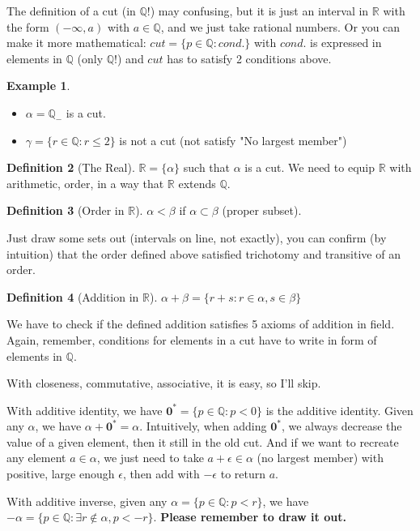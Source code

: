 \documentclass[12pt]{article}
\newcommand{\RR}{\mathbb{R}}   %
\newcommand{\QQ}{\mathbb{Q}}   %
\theoremstyle{definition}
\newtheorem{definition}{Definition}[section]
\newtheorem{example}[definition]{Example}
\theoremstyle{plain}
\begin{document}
\begin{note}
The definition of a cut (in $\QQ$!) may confusing, but it is just an interval in $\RR$ with the form $(-\infty, a)$ with $a \in \QQ$, and we just take rational numbers. Or you can make it more mathematical: $cut = \{p\in\QQ: cond.\}$ with $cond.$ is expressed in elements in $\QQ$ (only $\QQ$!) and $cut$ has to satisfy 2 conditions above.
\end{note}

\begin{example}

\begin{itemize}
    \item $\alpha = \QQ_-$ is a cut.
    \item $\gamma = \{r \in \QQ: r \le 2\}$ is not a cut (not satisfy "No largest member")
\end{itemize}

\end{example}

\begin{definition}[The Real]
$\RR = \{\alpha\}$ such that $\alpha$ is a cut. We need to equip $\RR$ with arithmetic, order, in a way that $\RR$ extends $\QQ$.
\end{definition}

\begin{definition}[Order in $\RR$]
$\alpha < \beta$ if $\alpha \subset \beta$ (proper subset).
\end{definition}

\begin{note}
Just draw some sets out (intervals on line, not exactly), you can confirm (by intuition) that the order defined above satisfied trichotomy and transitive of an order.     
\end{note}

\begin{definition}[Addition in $\RR$]
$\alpha + \beta = \{r+s: r\in\alpha, s\in\beta\}$
\end{definition}


\begin{note}
We have to check if the defined addition satisfies 5 axioms of addition in field. Again, remember, conditions for elements in a cut have to write in form of elements in $\QQ$.

With closeness, commutative, associative, it is easy, so I'll skip.

With additive identity, we have $\mathbf{0}^* = \{p\in\QQ: p<0\}$ is the additive identity. Given any $\alpha$, we have $\alpha + \mathbf{0}^* = \alpha$. Intuitively, when adding $\mathbf{0}^*$, we always decrease the value of a given element, then it still in the old cut. And if we want to recreate any element $a \in \alpha$, we just need to take $a + \epsilon \in \alpha$ (no largest member) with positive, large enough $\epsilon$, then add with $-\epsilon$ to return $a$.

With additive inverse, given any $\alpha = \{p \in \QQ: p < r\}$, we have $-\alpha = \{p \in \QQ: \exists r \notin \alpha, p < -r\}$. \textbf{Please remember to draw it out.}
\end{note}
\end{document}

